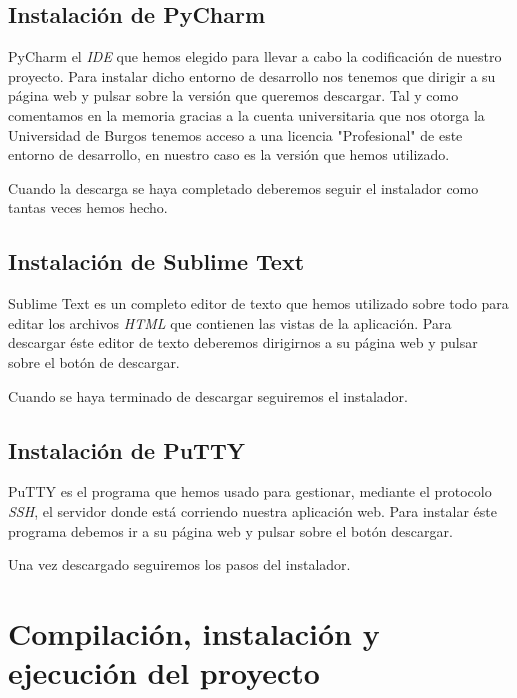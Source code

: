 \subsection{Instalación de PyCharm}

PyCharm el \textit{IDE} que hemos elegido para llevar a cabo la codificación de nuestro proyecto. Para instalar dicho entorno de desarrollo nos tenemos que dirigir a su página web \cite{pycharm} y pulsar sobre la versión que queremos descargar. Tal y como comentamos en la memoria gracias a la cuenta universitaria que nos otorga la Universidad de Burgos tenemos acceso a una licencia "Profesional" de este entorno de desarrollo, en nuestro caso es la versión que hemos utilizado.


Cuando la descarga se haya completado deberemos seguir el instalador como tantas veces hemos hecho.

\subsection{Instalación de Sublime Text}

Sublime Text es un completo editor de texto que hemos utilizado sobre todo para editar los archivos \textit{HTML} que contienen las vistas de la aplicación. Para descargar éste editor de texto deberemos dirigirnos a su página web \cite{sublime} y pulsar sobre el botón de descargar.


Cuando se haya terminado de descargar seguiremos el instalador.

 
\subsection{Instalación de PuTTY}

PuTTY es el programa que hemos usado para gestionar, mediante el protocolo \textit{SSH}, el servidor donde está corriendo nuestra aplicación web. Para instalar éste programa debemos ir a su página web \cite{putty} y pulsar sobre el botón descargar.


Una vez descargado seguiremos los pasos del instalador.

\section{Compilación, instalación y ejecución del proyecto}

